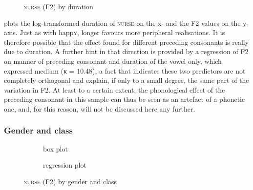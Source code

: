 \begin{figure}
	
		\resizebox{0.5\linewidth}{!}{} 
	\caption{\textsc{nurse} (F2) by duration}
	\label{fig.scatter.f2w.nurse.dur}
\end{figure}

\largerpage
{} plots the log-transformed duration of \textsc{nurse} on the x- and the F2 values on the y-axis.
Just as with happ\textsc{y}, longer  favours more peripheral realisations.
It is therefore possible that the effect found for different preceding consonants is really due to duration.
A further hint in that direction is provided by a regression of F2 on manner of preceding consonant and duration of the vowel only, which expressed medium  (κ = 10.48), a fact that indicates these two predictors are not completely orthogonal and explain, if only to a small degree, the same part of the variation in F2.
At least to a certain extent, the phonological effect of the preceding consonant in this sample can thus be seen as an artefact of a phonetic one, and, for this reason, will not be discussed here any further.

\subsubsection{Gender and class}
\label{sec.prod.res.vow.nurse.f2.genderclass}

\begin{figure}
	
	\begin{subfigure}{.49\textwidth}
		
			\resizebox{\linewidth}{!}{} 
		\caption{box plot}
		\label{fig.box.f2w.nurse.genderclass}
	\end{subfigure}
	\begin{subfigure}{.49\textwidth}
		
			\resizebox{\linewidth}{!}{} 
		\caption{regression plot}
		\label{fig.scatter.f2w.nurse.genderclass}
	\end{subfigure}
	\caption{\textsc{nurse} (F2) by gender and class}
\end{figure}

